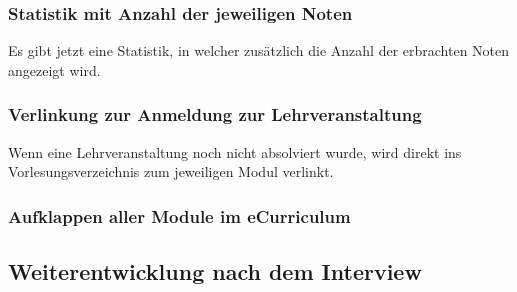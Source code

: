 \documentclass[a4paper,10pt]{scrartcl}
\begin{document}
\subsubsection*{Statistik mit Anzahl der jeweiligen Noten}

Es gibt jetzt eine Statistik, in welcher zusätzlich die Anzahl der erbrachten Noten angezeigt wird.

\noindent{}
\medskip

\subsubsection*{Verlinkung zur Anmeldung zur Lehrveranstaltung}

Wenn eine Lehrveranstaltung noch nicht absolviert wurde, wird direkt ins Vorlesungsverzeichnis zum jeweiligen Modul verlinkt.

\noindent{}
\medskip

\subsubsection*{Aufklappen aller Module im eCurriculum}




\subsection{Weiterentwicklung nach dem Interview}
\end{document}
